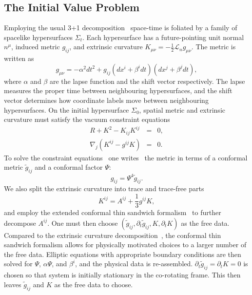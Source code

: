 \documentclass[aps,prd,amsmath,floatfix,twocolumn,superscriptaddress,nofootinbib,showpacs]{revtex4-1}
\theoremstyle{plain}
\theoremstyle{definition}
\begin{document}
\subsection{The Initial Value Problem}
\label{subsec:IVP}
Employing the usual 3+1 decomposition~\cite{ADM,york79} space-time is foliated by a family
of spacelike hypersurfaces $\Sigma_t$. Each hypersurface has a
future-pointing unit normal $n^{\mu}$, induced metric $g_{ij}$, and
extrinsic curvature
$K_{\mu\nu}=-\frac{1}{2}\mathcal{L}_{n}g_{\mu\nu}$. The metric is
written as 
\begin{equation}
g_{\mu\nu}=-\alpha^2dt^2+g_{ij}\left(dx^i+\beta^idt\right)\left(dx^j+\beta^jdt\right),
\end{equation}
where $\alpha$ and $\beta$ are the lapse function and the shift vector
respectively. The lapse measures the proper time between neighbouring
hypersurfaces, and the shift vector determines how coordinate labels
move between neighbouring hypersurfaces.  On the initial
hypersurface $\Sigma_0$, spatial metric and extrinsic curvature must satisfy the vacuum
constraint equations
\begin{eqnarray}
R+K^2-K_{ij}K^{ij}&=&0, \\
\nabla_j\left(K^{ij}-g^{ij}K\right)&=&0.
\end{eqnarray}
To solve the constraint equations \ one writes~\cite{Lichnerowicz44}
the metric in terms of a conformal metric $\tilde{g}_{ij}$ and a
conformal factor $\Psi$:
\begin{equation}
g_{ij}=\Psi^4\tilde{g}_{ij}.
\end{equation}
We also split the extrinsic curvature into trace and trace-free parts
\begin{equation}
K^{ij}=A^{ij}+\frac{1}{3}g^{ij}K,
\end{equation}
and employ the extended conformal thin sandwich formalism~\cite{York1999,Pfeiffer2003b} to further
decompose $A^{ij}$.  One must then choose
$\left(\tilde{g}_{ij},\partial_{t}\tilde{g}_{ij},K,\partial_{t}K\right)$
as the free data.  Compared to the extrinsic curvature decomposition~\cite{Murchadha-York:1974b}, the conformal thin sandwich formalism allows for 
physically motivated choices to a larger number of the free data.  Elliptic equations
with appropriate boundary conditions are then solved for $\Psi$,
$\alpha\Psi$, and $\beta^i$, and the physical data is
re-assembled. $\partial_t\tilde{g}_{ij} = \partial_tK = 0$ is chosen
so that system is initially stationary in the co-rotating
frame.  This then leaves $\tilde{g}_{ij}$ and $K$ as the free data to
choose.  
\end{document}
